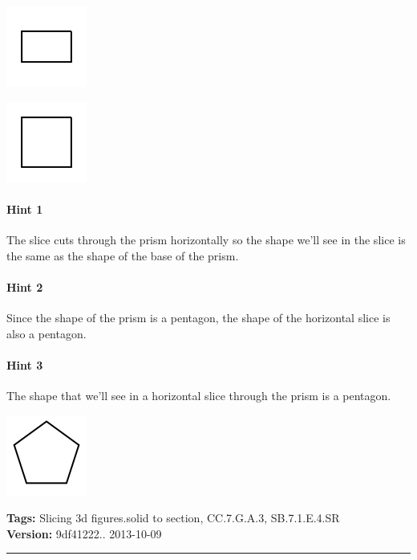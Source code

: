 \documentclass[twocolumn,10pt]{article}
\def\shrinkfactor{0.4}
\begin{document}
\includegraphics[scale=\shrinkfactor]{figures/0e5042b475e0847d67b74c0482f8e8173f798656.png}


\includegraphics[scale=\shrinkfactor]{figures/4b59a0ece6acc7c19c389e1de534d1df93bf1169.png}



\paragraph{Hint 1}The slice cuts through the prism horizontally so the shape we'll see in the slice is the same as the shape of the base of the prism.

\paragraph{Hint 2}Since the shape of the prism is a pentagon, the shape of the horizontal slice is also a pentagon.

\paragraph{Hint 3}The shape that we'll see in a horizontal slice through the prism is a pentagon.  

\includegraphics[scale=\shrinkfactor]{figures/498a6b09730fdba2360826c138eeee142e8cccc1.png}



\medskip
\noindent
\textbf{Tags:} {\footnotesize Slicing 3d figures.solid to section, CC.7.G.A.3, SB.7.1.E.4.SR}\\
\textbf{Version:} 9df41222.. 2013-10-09
\smallskip\hrule
\end{document}
